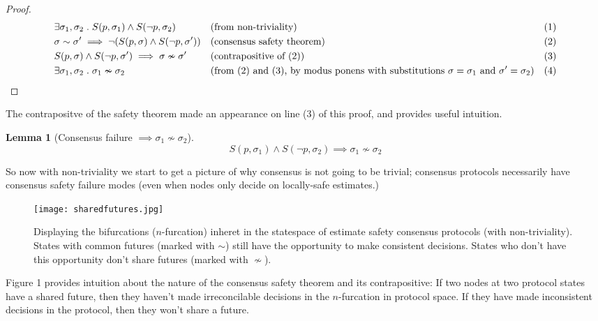 \documentclass{article}
\theoremstyle{definition}
\newtheorem{lemma}{Lemma}
\begin{document}
\begin{proof}
\begin{align*}
  &\exists \sigma_1, \sigma_2 \hspace{1mm} . \hspace{1mm}S(p,\sigma_1) \land S(\neg{p},\sigma_2) &&\text{(from non-triviality)} &&\text{(1)}\\
  &\sigma \sim \sigma' \implies \neg(S(p,\sigma) \land S(\neg{p},\sigma')) &&\text{(consensus safety theorem)} &&\text{(2)}\\
  &S(p,\sigma) \land S(\neg{p},\sigma') \implies \sigma \nsim \sigma' &&\text{(contrapositive of (2))} &&\text{(3)}\\
  &\exists \sigma_1, \sigma_2 \hspace{1mm} . \hspace{1mm}\sigma_1 \nsim \sigma_2 \hspace{5mm} \qedhere &&\text{(from (2) and (3), by modus ponens with substitutions $\sigma=\sigma_1$ and $\sigma'=\sigma_2$)} &&\text{(4)}\\
\end{align*}
\end{proof}

The contrapositve of the safety theorem made an appearance on line (3) of this proof, and provides useful intuition.

\begin{lemma}[Consensus failure $\implies \sigma_1 \nsim \sigma_2$]
$$
S(p,\sigma_1) \land S(\neg{p},\sigma_2) \implies \sigma_1 \nsim \sigma_2
$$
\end{lemma}

So now with non-triviality we start to get a picture of why consensus is not going to be trivial; consensus protocols necessarily have consensus safety failure modes (even when nodes only decide on locally-safe estimates.)

\begin{figure}[!htb]
\centering
\texttt{[image: sharedfutures.jpg]}
\caption{Displaying the bifurcations ($n$-furcation) inheret in the statespace of estimate safety consensus protocols (with non-triviality). States with common futures (marked with $\sim$) still have the opportunity to make consistent decisions. States who don't have this opportunity don't share futures (marked with $\nsim$).}
\end{figure}

Figure 1 provides intuition about the nature of the consensus safety theorem and its contrapositive: If two nodes at two protocol states have a shared future, then they haven't made irreconcilable decisions in the $n$-furcation in protocol space. If they have made inconsistent decisions in the protocol, then they won't share a future.
\end{document}
